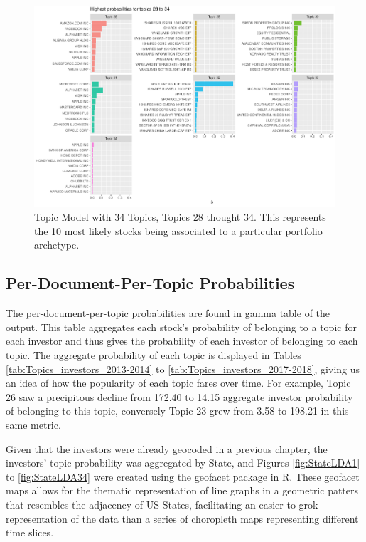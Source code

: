 \begin{figure}
	\centering
	\includegraphics[width=\linewidth]{Figures/ChapterV/LDA34_28_34}
	\caption[Topic Model with 34 Topics, Topics 28 thought 34]{Topic Model with 34 Topics, Topics 28 thought 34. This represents the 10 most likely stocks being associated to a particular portfolio archetype.}
	\label{fig:lda34-28-34}
\end{figure}


\subsection{Per-Document-Per-Topic Probabilities}

The per-document-per-topic probabilities are found in gamma table of the output.  This table aggregates each stock's probability of belonging to a topic for each investor and thus gives the probability of each investor of belonging to each topic.  The aggregate probability of each topic is displayed in Tables \ref{tab:Topics_investors_2013-2014} to \ref{tab:Topics_investors_2017-2018}, giving us an idea of how the popularity of each topic fares over time.  For example, Topic 26 saw a precipitous decline from 172.40 to 14.15 aggregate investor probability of belonging to this topic, conversely Topic 23 grew from 3.58 to 198.21 in this same metric.  

Given that the investors were already geocoded in a previous chapter, the investors' topic probability was aggregated by State, and Figures \ref{fig:StateLDA1} to \ref{fig:StateLDA34} were created using the geofacet package in R. These geofacet maps allows for the thematic representation of line graphs in a geometric patters that resembles the adjacency of US States, facilitating an easier to grok representation of the data than a series of choropleth maps representing different time slices.  

